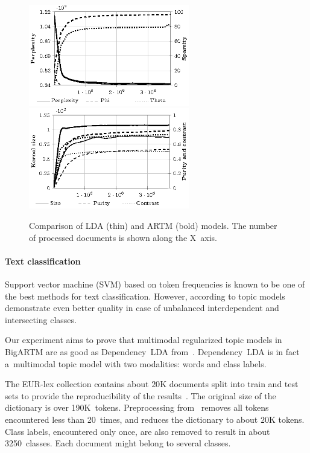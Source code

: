 \documentclass{sig-alternate-2013}
\begin{document}
\begin{figure}[t]
    \centering
    \includegraphics[width=70mm]{plot_perplexity_sparsity.eps}\\
    \includegraphics[width=70mm]{plot_kernel.eps}
\caption{Comparison of LDA (thin) and ARTM (bold) models. The number of processed documents is shown along the X~axis.}
\label{fig:comparison_plot}
\end{figure}

\paragraph{Text classification}

Support vector machine (SVM) based on token frequencies is known to be one of the best methods for text classification.
However, according to \cite{rubin12statistical} topic models demonstrate even better quality in case of unbalanced interdependent and intersecting classes.

Our experiment aims to prove that multimodal regularized topic models in BigARTM are as good as Dependency~LDA from~\cite{rubin12statistical}.
Dependency~LDA is in fact a~multimodal topic model with two modalities: words and class labels.

The EUR-lex collection contains about $20$K documents
split into train and test sets to provide the reproducibility of the results~\cite{rubin12statistical}.
The original size of the dictionary is over 190K~tokens.
Preprocessing from~\cite{rubin12statistical} removes all tokens encountered less than 20~times,
and reduces the dictionary to about $20$K tokens.
Class labels, encountered only once, are also removed to result in about 3250~classes.
Each document might belong to several classes.
\end{document}
